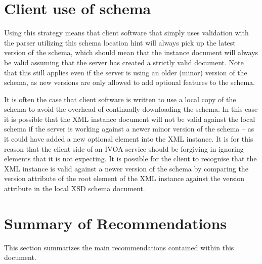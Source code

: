\documentclass[10pt,a4paper]{ivoa}
\begin{document}
\section{Client use of schema}
Using this strategy means that client software that simply uses validation with
the parser utilizing this schema location hint will always pick up the latest
version of the schema, which should mean that the instance document will always
be valid assuming that the server has created a strictly valid document. Note
that this still applies even if the server is using an older (minor) version of
the schema, as new versions are only allowed to add optional features to the
schema.

It is often the case that client software is written to use a local copy of the
schema to avoid the overhead of continually downloading the schema. In this case
it is possible that the XML instance document will not be valid against the
local schema if the server is working against a newer minor version of the
schema -- as it could have added a new optional element into the XML instance.
It is for this reason that the client side of an IVOA service should be
forgiving in ignoring elements that it is not expecting. It is possible for the
client to recognise that the XML instance is valid against a newer version of
the schema by comparing the version attribute of the root element of the XML
instance against the version attribute in the local XSD schema document.

\section{Summary of Recommendations}
This section summarizes the main recommendations contained within this document.
\end{document}
